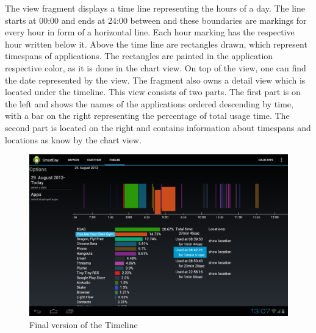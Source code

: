 The  view fragment displays a time line representing the hours of a day. The line starts at 00:00 and ends at 24:00 between and these boundaries are markings for every hour in form of a horizontal line. Each hour marking has the respective hour written below it. Above the time line are rectangles drawn, which represent timespans of applications. The rectangles are painted in the application respective color, as it is done in the chart view. On top of the view, one can find the date represented by the view. The fragment also owns a detail view which is located under the timeline. This view consists of two parts. The first part is on the left and shows the names of the applications ordered descending by time, with a bar on the right representing the percentage of total usage time. The second part is located on the right and contains information about timespans and locations as know by the chart view.
\begin{figure}[h]
	\caption{Final version of the Timeline}
	\label{fig:timelinefinal}
	\includegraphics[width=\textwidth]{images/Screenshots/vfinal/Screenshot_2013-08-30-13-07-54.png}
\end{figure}

